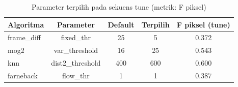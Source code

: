 \begin{table}[t]
\centering
\caption{Parameter terpilih pada sekuens tune (metrik: F piksel)}
\label{tab:table_tuning}
\begin{tabular}{lcccc}
\toprule
Algoritma & Parameter & Default & Terpilih & F piksel (tune) \\
\midrule
frame\_diff & fixed\_thr & 25 & 5 & 0.372 \\
mog2 & var\_threshold & 16 & 25 & 0.543 \\
knn & dist2\_threshold & 400 & 600 & 0.600 \\
farneback & flow\_thr & 1 & 1 & 0.387 \\
\bottomrule
\end{tabular}
\end{table}
